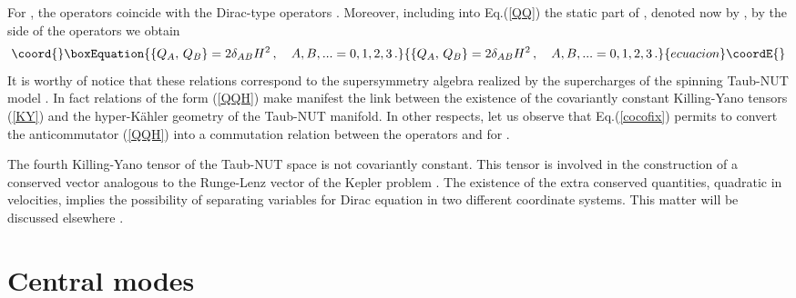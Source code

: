 \documentclass[a4paper,12pt]{article}
\begin{document}
For \coordHE{}, the  operators  \coordHE{} coincide 
with the Dirac-type operators \coordHE{}. Moreover, including into 
Eq.(\ref{QQ}) the static part of \coordHE{}, denoted now by \coordHE{},
by the side of the operators \coordHE{} we obtain 
\begin{equation}\coord{}\boxEquation{\label{QQH}
\{Q_{A},\,Q_{B}\}=2\delta_{AB}H^2\,, \quad A,B,...=0,1,2,3\,.
}{\{Q_{A},\,Q_{B}\}=2\delta_{AB}H^2\,, \quad A,B,...=0,1,2,3\,.
}{ecuacion}\coordE{}\end{equation}  
It is worthy of notice that these relations correspond to the \coordHE{} 
supersymmetry algebra realized by the supercharges of the spinning 
Taub-NUT model \cite{GR,G2,G3}. In fact  relations of the form (\ref{QQH})
make manifest the link between the existence of the covariantly constant
Killing-Yano tensors (\ref{KY}) and the hyper-K\" ahler geometry of the 
Taub-NUT manifold. In other respects, let us observe that Eq.(\ref{cocofix})
permits to convert the anticommutator (\ref{QQH}) into a 
commutation relation between the operators \coordHE{} and \coordHE{} for 
\coordHE{}.

The fourth Killing-Yano tensor of the Taub-NUT space is not covariantly 
constant. This tensor is involved in the construction of 
a conserved vector analogous to the Runge-Lenz vector of the Kepler problem
\cite{GR,G2,G3}.
The existence of the extra conserved quantities, quadratic in velocities, 
implies the possibility of separating variables for Dirac equation in two
different coordinate systems. This matter will be discussed elsewhere 
\cite{CV1}. 

\section{Central modes}
\
\end{document}
